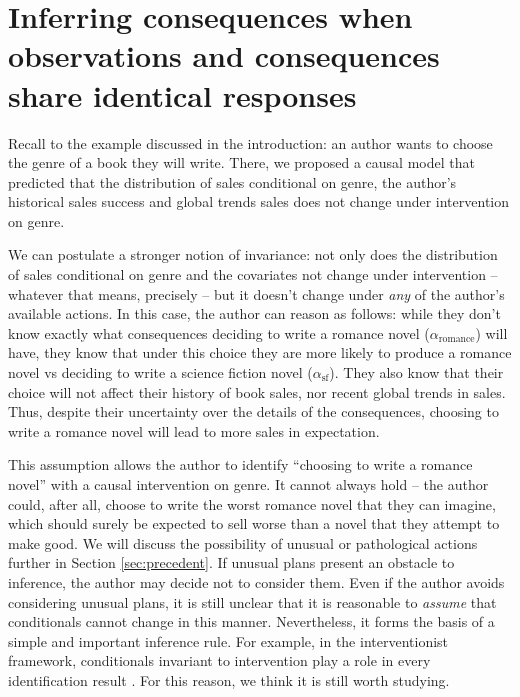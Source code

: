 
\section[Identical responses]{Inferring consequences when observations and consequences share identical responses}\label{sec:evaluating_decisions}

Recall to the example discussed in the introduction: an author wants to choose the genre of a book they will write. There, we proposed a causal model that predicted that the distribution of sales conditional on genre, the author's historical sales success and global trends sales does not change under intervention on genre.

We can postulate a stronger notion of invariance: not only does the distribution of sales conditional on genre and the covariates not change under intervention -- whatever that means, precisely -- but it doesn't change under \emph{any} of the author's available actions. In this case, the author can reason as follows: while they don't know exactly what consequences deciding to write a romance novel ($\alpha_{\mathrm{romance}}$) will have, they know that under this choice they are more likely to produce a romance novel vs deciding to write a science fiction novel ($\alpha_{\mathrm{sf}}$). They also know that their choice will not affect their history of book sales, nor recent global trends in sales. Thus, despite their uncertainty over the details of the consequences, choosing to write a romance novel will lead to more sales in expectation.

This assumption allows the author to identify ``choosing to write a romance novel'' with a causal intervention on genre. It cannot always hold -- the author could, after all, choose to write the worst romance novel that they can imagine, which should surely be expected to sell worse than a novel that they attempt to make good. We will discuss the possibility of unusual or pathological actions further in Section \ref{sec:precedent}. If unusual plans present an obstacle to inference, the author may decide not to consider them. Even if the author avoids considering unusual plans, it is still unclear that it is reasonable to \emph{assume} that conditionals cannot change in this manner. Nevertheless, it forms the basis of a simple and important inference rule. For example, in the interventionist framework, conditionals invariant to intervention play a role in every identification result \citep{richardson_nested_2017}. For this reason, we think it is still worth studying.

